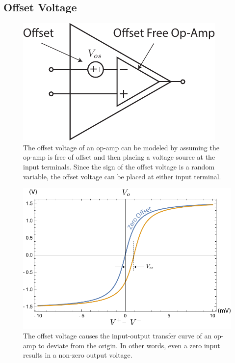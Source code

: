 \subsection{Offset Voltage}
\begin{figure}[tb]
\begin{center}
\includegraphics[scale=1]{opamp_offset}
\end{center}
\caption{The offset voltage of an op-amp can be modeled by assuming the op-amp is free of offset and then placing a voltage source at the input terminals.  Since the sign of the offset voltage is a random variable, the offset voltage can be placed at either input terminal.}
\label{fig:opamp_offset}
\end{figure}
\begin{figure}[tb]
\begin{center}
\includegraphics[width=.75\columnwidth]{opamp_offset_plot}
\end{center}
\caption{The offset voltage causes the input-output transfer curve of an op-amp to deviate from the origin.  In other words, even a zero input results in a non-zero output voltage.} \label{fig:opamp_offset_plot}
\end{figure}

